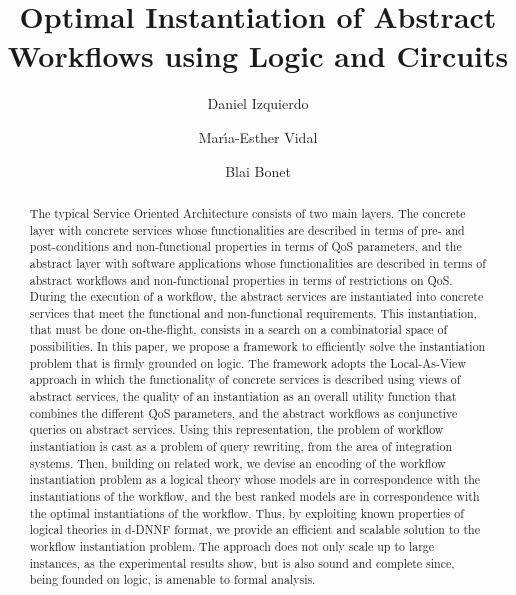 \documentclass{llncs}
\begin{document}
\allowdisplaybreaks
\title{Optimal Instantiation of Abstract Workflows using Logic and Circuits}
\author{Daniel Izquierdo \and Mar\'{\i}a-Esther Vidal \and Blai Bonet}
\maketitle

\begin{abstract}
The typical Service Oriented Architecture consists of two main layers.
The concrete layer with concrete services whose functionalities are
described in terms of pre- and post-conditions and non-functional
properties in terms of QoS parameters, and the abstract layer with
software applications whose functionalities are described in terms
of abstract workflows and non-functional properties in terms of
restrictions on QoS.
During the execution of a workflow, the abstract services are instantiated
into concrete services that meet the functional and non-functional
requirements. This instantiation, that must be done on-the-flight,
consists in a search on a combinatorial space of possibilities.
In this paper, we propose a framework to efficiently solve the
instantiation problem that is firmly grounded on logic.
The framework adopts the Local-As-View approach in which
the functionality of concrete services is described using views
of abstract services, the quality of an instantiation as an
overall utility function that combines the different QoS parameters,
and the abstract workflows as conjunctive queries on abstract services.
Using this representation, the problem of workflow instantiation 
is cast as a problem of query rewriting, from the area of integration
systems.
Then, building on related work, we devise an encoding of the
workflow instantiation problem as a logical theory whose models
are in correspondence with the instantiations of the workflow,
and the best ranked models are in correspondence with the
optimal instantiations of the workflow.
Thus, by exploiting known properties of logical theories in 
d-DNNF format, we provide an efficient and scalable solution
to the workflow instantiation problem.
The approach does not only scale up to large instances, as the
experimental results show, but is also sound and complete since,
being founded on logic, is amenable to formal analysis.
\end{abstract}                
\end{document}

